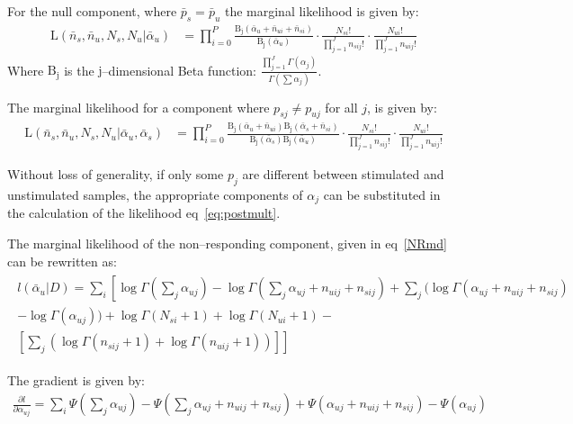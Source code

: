 \documentclass[11pt]{article}
\begin{document}
For the null component, where $\bar{p}_{s}=\bar{p}_{u}$ the marginal likelihood is given by: 
\begin{align}
\mathrm{L}(\bar{n}_s,\bar{n}_u,N_s,N_u|\bar{\alpha}_u) &= \prod_{i=0}^P\frac{ \mathrm{B_j}(\bar{\alpha}_{u}+\bar{n}_{ui}+\bar{n}_{si})}{\mathrm{B_j}(\bar{\alpha}_u)} \cdot \frac{N_{si}!}{\prod_{j=1}^J n_{sij}!} \cdot \frac{N_{ui}!}{\prod_{j=1}^J n_{uij}!}\label{NRmd}
\end{align}
Where $\mathrm{B_j}$ is the $\mathrm{j}$--dimensional Beta function: $\frac{\prod_{j=1}^J\Gamma(\alpha_j)}{\Gamma(\sum\alpha_j)}$.

The marginal likelihood for a component where $p_{sj} \ne p_{uj}$ for all $j$, is given by:
\begin{align}
\mathrm{L}(\bar{n}_s,\bar{n}_u,N_s,N_u|\bar{\alpha}_u,\bar{\alpha}_s) &= \prod_{i=0}^P\frac{  \mathrm{B_j}(\bar{\alpha}_{u}+\bar{n}_{ui}) \mathrm{B_j}(\bar{\alpha}_{s}+\bar{n}_{si})}{\mathrm{B_j}(\bar{\alpha}_s)\mathrm{B_j}(\bar{\alpha}_u)} \cdot \frac{N_{si}!}{\prod_{j=1}^J n_{sij}!} \cdot \frac{N_{ui}!}{\prod_{j=1}^J n_{uij}!}\label{eq:postmult}
\end{align}

Without loss of generality, if only some $p_j$ are different between stimulated and unstimulated samples, the appropriate components of $\alpha_j$  can be substituted in the calculation of the likelihood eq~\eqref{eq:postmult}.


The marginal likelihood of the non--responding component, given in eq~\eqref{NRmd} can be rewritten as:
\begin{align}
\begin{split}
l(\bar{\alpha}_u|D)=\sum_i \left[ \log \Gamma (\sum_j \alpha_{uj}) - \log \Gamma (\sum_j \alpha_{uj}+n_{uij}+n_{sij})+ \sum_j (\log \Gamma(\alpha_{uj}+n_{uij}+n_{sij}) \right.\\ \left. -\log\Gamma(\alpha_{uj}))+ \log\Gamma(N_{si}+1) +\log\Gamma(N_{ui}+1)-\right.\\ \left.\left[\sum_j(\log\Gamma(n_{sij}+1)+\log\Gamma(n_{uij}+1))\right]\right]\label{mdloglike}
\end{split}
\end{align}

The gradient is given by:
\begin{align}
\frac{\partial l}{ \partial \alpha_{uj}} = \sum_i \Psi(\sum_j \alpha_{uj}) - \Psi (\sum_j \alpha_{uj}+n_{uij}+n_{sij}) + \Psi(\alpha_{uj}+n_{uij}+n_{sij}) - \Psi(\alpha_{uj})\label{mdgrad}
\end{align}
\end{document}
